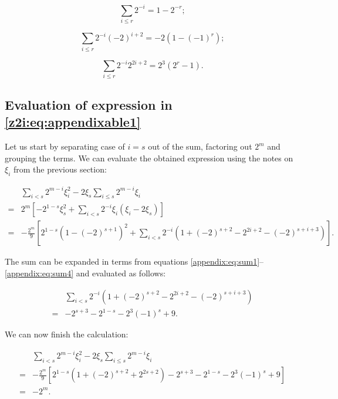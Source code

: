 \begin{equation}
	\label{appendix:eq:sum5}
	\sum\limits_{i \leq r} 2^{-i} = 1 - 2^{-r};
\end{equation}

\begin{equation}
	\label{appendix:eq:sum6}
	\sum\limits_{i \leq r} 2^{-i} (-2)^{i+2}
	= -2 (1 - (-1)^r);
\end{equation}

\begin{equation}
	\label{appendix:eq:sum7}
	\sum\limits_{i \leq r} 2^{-i} 2^{2i+2}
	= 2^3 (2^r - 1).
\end{equation}

\subsection{Evaluation of expression in \eqref{z2i:eq:appendixable1}}

Let us start by separating case of $i=s$ out of the sum, factoring out
$2^m$ and grouping the terms. We can evaluate the obtained
expression using the notes on $\xi_i$ from the previous section:

\begin{equation}
	\begin{split}
		& \sum\limits_{i<s} 2^{m-i} \xi_i^2 - 2 \xi_s \sum\limits_{i \leq s}  2^{m-i} \xi_i \\
		= & 2^m \left[
			-2^{1-s} \xi_s^2 
			+ \sum\limits_{i<s} 2^{-i} \xi_i (\xi_i - 2\xi_s)
		\right] \\
		= & - \frac{2^m}9 \left[
			2^{1-s} (1-(-2)^{s+1})^2
			+ \sum\limits_{i<s} 2^{-i} \left(
				1 + (-2)^{s+2} - 2^{2i+2} - (-2)^{s+i+3}
			\right)
		\right].
	\end{split}
\end{equation}

The sum can be expanded in terms from equations 
\eqref{appendix:eq:sum1}--\eqref{appendix:eq:sum4} and evaluated
as follows:

\begin{equation}
	\begin{split}
		& \sum\limits_{i<s} 2^{-i} \left(
			1 + (-2)^{s+2} - 2^{2i+2} - (-2)^{s+i+3}
		\right) \\
		= & -2^{s+3}  - 2^{1-s} - 2^3(-1)^s + 9.
	\end{split}
\end{equation}

We can now finish the calculation:

\begin{equation}
	\begin{split}
		& \sum\limits_{i<s} 2^{m-i} \xi_i^2 - 2 \xi_s \sum\limits_{i \leq s}  2^{m-i} \xi_i \\
		= & - \frac{2^m}9 \left[
			2^{1-s} (1+(-2)^{s+2} + 2^{2s+2})
			- 2^{s+3}  - 2^{1-s} - 2^3(-1)^s + 9
		\right] \\
		= & -2^m.
	\end{split}
\end{equation}

